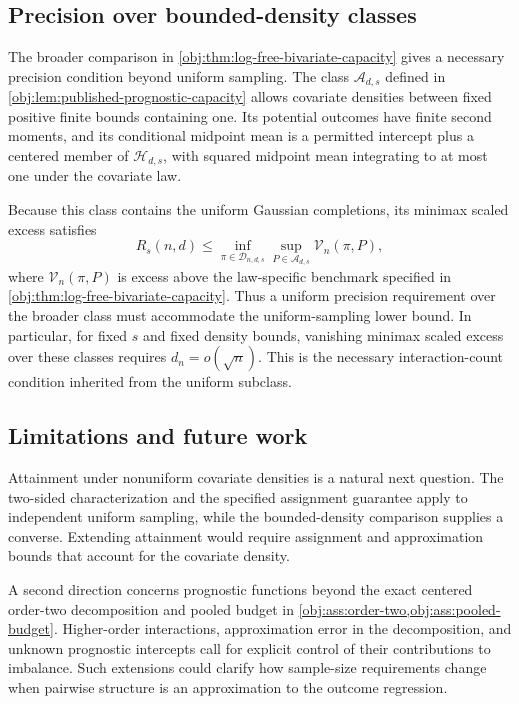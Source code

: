 \documentclass[11pt]{article}
\begin{document}
\subsection{Precision over bounded-density classes}

The broader comparison in \cref{obj:thm:log-free-bivariate-capacity} gives a necessary precision condition beyond uniform sampling. The class \(\mathcal A_{d,s}\) defined in \cref{obj:lem:published-prognostic-capacity} allows covariate densities between fixed positive finite bounds containing one. Its potential outcomes have finite second moments, and its conditional midpoint mean is a permitted intercept plus a centered member of \(\mathcal H_{d,s}\), with squared midpoint mean integrating to at most one under the covariate law.

Because this class contains the uniform Gaussian completions, its minimax scaled excess satisfies
\[
R_s(n,d)
\leq
\inf_{\pi\in\mathcal D_{n,d,s}}
\sup_{P\in\mathcal A_{d,s}}\mathcal V_n(\pi,P),
\]
where \(\mathcal V_n(\pi,P)\) is excess above the law-specific benchmark specified in \cref{obj:thm:log-free-bivariate-capacity}. Thus a uniform precision requirement over the broader class must accommodate the uniform-sampling lower bound. In particular, for fixed \(s\) and fixed density bounds, vanishing minimax scaled excess over these classes requires \(d_n=o(\sqrt n)\). This is the necessary interaction-count condition inherited from the uniform subclass.

\subsection{Limitations and future work}

Attainment under nonuniform covariate densities is a natural next question. The two-sided characterization and the specified assignment guarantee apply to independent uniform sampling, while the bounded-density comparison supplies a converse. Extending attainment would require assignment and approximation bounds that account for the covariate density.

A second direction concerns prognostic functions beyond the exact centered order-two decomposition and pooled budget in \cref{obj:ass:order-two,obj:ass:pooled-budget}. Higher-order interactions, approximation error in the decomposition, and unknown prognostic intercepts call for explicit control of their contributions to imbalance. Such extensions could clarify how sample-size requirements change when pairwise structure is an approximation to the outcome regression.
\end{document}
